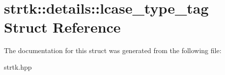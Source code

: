 \hypertarget{structstrtk_1_1details_1_1lcase__type__tag}{\section{strtk\-:\-:details\-:\-:lcase\-\_\-type\-\_\-tag Struct Reference}
\label{structstrtk_1_1details_1_1lcase__type__tag}
}


The documentation for this struct was generated from the following file\-:\begin{DoxyCompactItemize}
\item 
strtk.\-hpp\end{DoxyCompactItemize}

